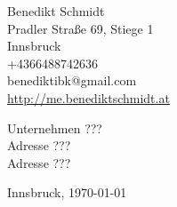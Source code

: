 \documentclass[12pt]{article}
\begin{document}
\begin{flushleft}
Benedikt Schmidt \\
Pradler Straße 69, Stiege 1 \\
Innsbruck \\
+4366488742636 \\
benediktibk@gmail.com \\
\url{http://me.benediktschmidt.at} \\
\end{flushleft}
\begin{flushleft}
Unternehmen ??? \\
Adresse ??? \\
Adresse ??? \\
\end{flushleft}
\begin{flushright}
Innsbruck, \today
\end{flushright}
\end{document}
